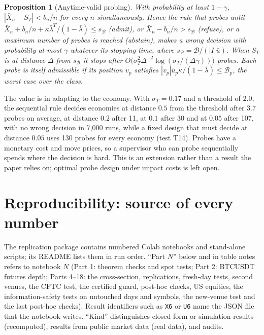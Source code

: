 \documentclass[12pt]{article}
\newtheorem{proposition}[theorem]{Proposition}
\theoremstyle{definition}
\theoremstyle{remark}
\begin{document}
\begin{proposition}[Anytime-valid probing]\label{prop:probe}
With probability at least $1-\gamma$, $|\bar X_n-S_T|<b_n/n$ for every $n$ simultaneously. Hence the rule that probes until $\bar X_n+b_n/n+\kappa\bar\lambda^T/(1-\bar\lambda)\le s_{\mathcal B}$ (admit), or $\bar X_n-b_n/n>s_{\mathcal B}$ (refuse), or a maximum number of probes is reached (abstain), makes a wrong decision with probability at most $\gamma$ whatever its stopping time, where $s_{\mathcal B}=\mathcal B/(|I|\bar u)$. When $S_T$ is at distance $\Delta$ from $s_{\mathcal B}$ it stops after $O\bigl(\sigma_T^2\Delta^{-2}\log(\sigma_T/(\Delta\gamma))\bigr)$ probes. Each probe is itself admissible if its position $v_p$ satisfies $|v_p|\bar u_p\kappa/(1-\bar\lambda)\le\mathcal B_p$, the worst case over the class.
\end{proposition}

The value is in adapting to the economy. With $\sigma_T=0.17$ and a threshold of $2.0$, the sequential rule decides economies at distance $0.5$ from the threshold after 3.7 probes on average, at distance $0.2$ after 11, at $0.1$ after 30 and at $0.05$ after 107, with no wrong decision in 7{,}000 runs, while a fixed design that must decide at distance $0.05$ uses 130 probes for every economy (test T14). Probes have a monetary cost and move prices, so a supervisor who can probe sequentially spends where the decision is hard. This is an extension rather than a result the paper relies on; optimal probe design under impact costs is left open.

\section{Reproducibility: source of every number}\label{app:repro}

The replication package contains numbered Colab notebooks and stand-alone scripts; its README lists them in run order. ``Part $N$'' below and in table notes refers to notebook $N$ (Part 1: theorem checks and spot tests; Part 2: BTCUSDT futures depth; Parts 4--18: the cross-section, replications, fresh-day tests, second venues, the CFTC test, the certified guard, post-hoc checks, US equities, the information-safety tests on untouched days and symbols, the new-venue test and the last post-hoc checks). Result identifiers such as \texttt{X6} or \texttt{U6} name the JSON file that the notebook writes. ``Kind'' distinguishes closed-form or simulation results (recomputed), results from public market data (real data), and audits.
\end{document}

